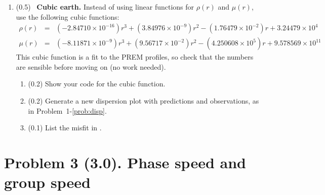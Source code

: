 \documentclass[11pt,titlepage,fleqn]{article}
\begin{document}
\begin{enumerate}
\label{prob:earth_linear}


\item (0.5) \ptag\ {\bf Cubic earth.} Instead of using linear functions for $\rho(r)$ and $\mu(r)$, use the following cubic functions:
%
\begin{eqnarray*}
\rho(r) &=& (-2.84710 \times 10^{-16})r^3 + (3.84976 \times 10^{-9})r^2 - (1.76479 \times 10^{-2})r + 3.24479 \times 10^{4}
\\
\mu(r) &=& (-8.11871 \times 10^{-9}) r^3 + (9.56717 \times 10^{-2})r^2 - (4.250608 \times 10^{5})r + 9.578569 \times 10^{11}
\end{eqnarray*}
%
%
This cubic function is a fit to the PREM profiles, so check that the numbers are sensible before moving on (no work needed).

\begin{enumerate}
\item (0.2) Show your code for the cubic function.
\item (0.2) Generate a new dispersion plot with predictions and observations, as in Problem~1-\ref{prob:disp}.
\item (0.1) List the misfit in .
\end{enumerate}

\label{prob:earth_cubic}

%


\end{enumerate}


\pagebreak
\section*{Problem 3 (3.0). Phase speed and group speed}
\end{document}
